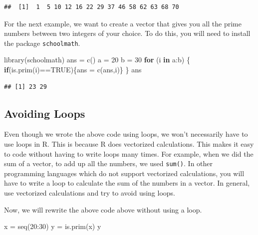 \documentclass[
]{article}
\newenvironment{Shaded}{\begin{snugshade}}{\end{snugshade}}
\newcommand{\ConstantTok}[1]{\textcolor[rgb]{0.00,0.00,0.00}{#1}}
\newcommand{\ControlFlowTok}[1]{\textcolor[rgb]{0.13,0.29,0.53}{\textbf{#1}}}
\newcommand{\DecValTok}[1]{\textcolor[rgb]{0.00,0.00,0.81}{#1}}
\newcommand{\FunctionTok}[1]{\textcolor[rgb]{0.00,0.00,0.00}{#1}}
\newcommand{\NormalTok}[1]{#1}
\newcommand{\OtherTok}[1]{\textcolor[rgb]{0.56,0.35,0.01}{#1}}
\newcommand{\SpecialCharTok}[1]{\textcolor[rgb]{0.00,0.00,0.00}{#1}}
\begin{document}
\begin{verbatim}
##  [1]  1  5 10 12 16 22 29 37 46 58 62 63 68 70
\end{verbatim}

For the next example, we want to create a vector that gives you all the
prime numbers between two integers of your choice. To do this, you will
need to install the package \texttt{schoolmath}.

\begin{Shaded}
\begin{Highlighting}[]
\FunctionTok{library}\NormalTok{(schoolmath)}
\NormalTok{ans }\OtherTok{=} \FunctionTok{c}\NormalTok{()}
\NormalTok{a }\OtherTok{=} \DecValTok{20}
\NormalTok{b }\OtherTok{=} \DecValTok{30}
\ControlFlowTok{for}\NormalTok{ (i }\ControlFlowTok{in}\NormalTok{ a}\SpecialCharTok{:}\NormalTok{b)}
\NormalTok{\{}
  \ControlFlowTok{if}\NormalTok{(}\FunctionTok{is.prim}\NormalTok{(i)}\SpecialCharTok{==}\ConstantTok{TRUE}\NormalTok{)\{ans }\OtherTok{=} \FunctionTok{c}\NormalTok{(ans,i)\}}
\NormalTok{\}}
\NormalTok{ans}
\end{Highlighting}
\end{Shaded}

\begin{verbatim}
## [1] 23 29
\end{verbatim}

\hypertarget{avoiding-loops}{%
\subsection{Avoiding Loops}\label{avoiding-loops}}

Even though we wrote the above code using loops, we won't necessarily
have to use loops in R. This is because R does vectorized calculations.
This makes it easy to code without having to write loops many times. For
example, when we did the sum of a vector, to add up all the numbers, we
used \texttt{sum()}. In other programming languages which do not support
vectorized calculations, you will have to write a loop to calculate the
sum of the numbers in a vector. In general, use vectorized calculations
and try to avoid using loops.

Now, we will rewrite the above code above without using a loop.

\begin{Shaded}
\begin{Highlighting}[]
\NormalTok{x }\OtherTok{=} \FunctionTok{seq}\NormalTok{(}\DecValTok{20}\SpecialCharTok{:}\DecValTok{30}\NormalTok{)}
\NormalTok{y }\OtherTok{=} \FunctionTok{is.prim}\NormalTok{(x)}
\NormalTok{y}
\end{Highlighting}
\end{Shaded}
\end{document}
